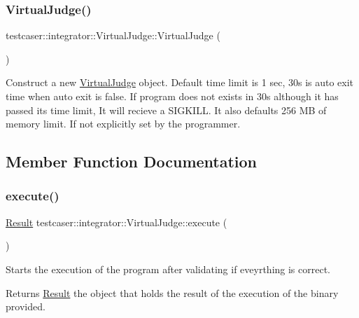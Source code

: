 \subsubsection{\texorpdfstring{VirtualJudge()}{VirtualJudge()}}
{\footnotesize\ttfamily testcaser\+::integrator\+::\+Virtual\+Judge\+::\+Virtual\+Judge (\begin{DoxyParamCaption}{ }\end{DoxyParamCaption})\hspace{0.3cm}{\ttfamily [inline]}}



Construct a new \mbox{\hyperlink{classtestcaser_1_1integrator_1_1VirtualJudge}{Virtual\+Judge}} object. Default time limit is 1 sec, 30s is auto exit time when auto exit is false. If program does not exists in 30s although it has passed its time limit, It will recieve a S\+I\+G\+K\+I\+LL. It also defaults 256 MB of memory limit. If not explicitly set by the programmer. 



\subsection{Member Function Documentation}
\mbox{\label{classtestcaser_1_1integrator_1_1VirtualJudge_ab50e9c4506fba192fd44fce0f2a21744}} 
\subsubsection{\texorpdfstring{execute()}{execute()}}
{\footnotesize\ttfamily \mbox{\hyperlink{classtestcaser_1_1integrator_1_1Result}{Result}} testcaser\+::integrator\+::\+Virtual\+Judge\+::execute (\begin{DoxyParamCaption}{ }\end{DoxyParamCaption})\hspace{0.3cm}{\ttfamily [inline]}}



Starts the execution of the program after validating if eveyrthing is correct. 

\begin{DoxyReturn}{Returns}
\mbox{\hyperlink{classtestcaser_1_1integrator_1_1Result}{Result}} the object that holds the result of the execution of the binary provided. 
\end{DoxyReturn}
\mbox{\label{classtestcaser_1_1integrator_1_1VirtualJudge_a9160dd070c63084495fe6d29cab58cb4}} 
